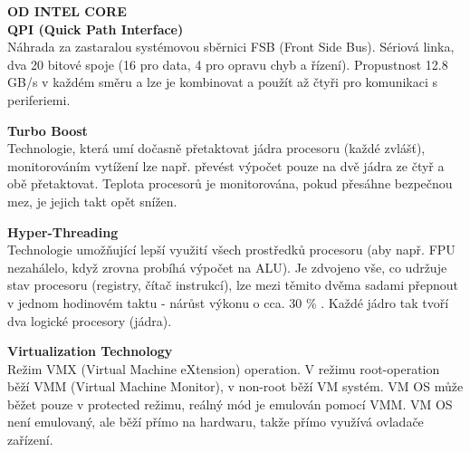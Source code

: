 \textbf{OD INTEL CORE} \\

\textbf{QPI (Quick Path Interface)}\\
Náhrada za zastaralou systémovou sběrnici FSB (Front Side Bus). Sériová linka, dva 20 bitové spoje (16 pro data, 4 pro opravu chyb a řízení).
Propustnost 12.8 GB/s v každém směru a lze je kombinovat a použít až čtyři pro komunikaci s periferiemi.

\textbf{Turbo Boost}\\
Technologie, která umí dočasně přetaktovat jádra procesoru (každé zvlášť), monitorováním vytížení lze např. převést výpočet pouze na dvě jádra ze čtyř a obě přetaktovat. Teplota procesorů je monitorována, pokud přesáhne bezpečnou mez, je jejich takt opět snížen.

\textbf{Hyper-Threading}\\
Technologie umožňující lepší využití všech prostředků procesoru (aby např. FPU nezahálelo, když zrovna probíhá výpočet na ALU). Je zdvojeno vše, co udržuje stav procesoru (registry, čítač instrukcí), lze mezi těmito dvěma sadami přepnout v jednom hodinovém taktu - nárůst výkonu o cca. 30 \% .
Každé jádro tak tvoří dva logické procesory (jádra).

\textbf{Virtualization Technology}\\
Režim VMX (Virtual Machine eXtension) operation. V režimu root-operation běží VMM (Virtual Machine Monitor), v non-root běží VM systém.
VM OS může běžet pouze v protected režimu, reálný mód je emulován pomocí VMM. VM OS není emulovaný, ale běží přímo na hardwaru, takže přímo využívá ovladače zařízení.
